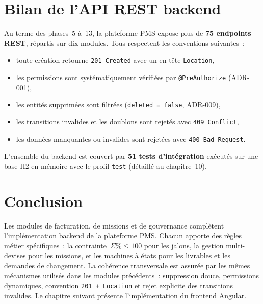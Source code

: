 \section{Bilan de l'API REST backend}

Au terme des phases~5 à~13, la plateforme PMS expose plus de \textbf{75 endpoints REST},
répartis sur dix modules. Tous respectent les conventions suivantes~:
\begin{itemize}
  \item toute création retourne \texttt{201 Created} avec un en-tête \texttt{Location},
  \item les permissions sont systématiquement vérifiées par \texttt{@PreAuthorize} (ADR-001),
  \item les entités supprimées sont filtrées (\texttt{deleted = false}, ADR-009),
  \item les transitions invalides et les doublons sont rejetés avec \texttt{409 Conflict},
  \item les données manquantes ou invalides sont rejetées avec \texttt{400 Bad Request}.
\end{itemize}

\noindent L'ensemble du backend est couvert par \textbf{51 tests d'intégration} exécutés sur une
base H2 en mémoire avec le profil \texttt{test} (détaillé au chapitre~10).

\section*{Conclusion}
Les modules de facturation, de missions et de gouvernance complètent l'implémentation backend de la
plateforme PMS. Chacun apporte des règles métier spécifiques~: la contrainte~$\Sigma\%\leq 100$ pour
les jalons, la gestion multi-devises pour les missions, et les machines à états pour les livrables
et les demandes de changement. La cohérence transversale est assurée par les mêmes mécanismes
utilisés dans les modules précédents~: suppression douce, permissions dynamiques, convention
\texttt{201 + Location} et rejet explicite des transitions invalides. Le chapitre suivant présente
l'implémentation du frontend Angular.
